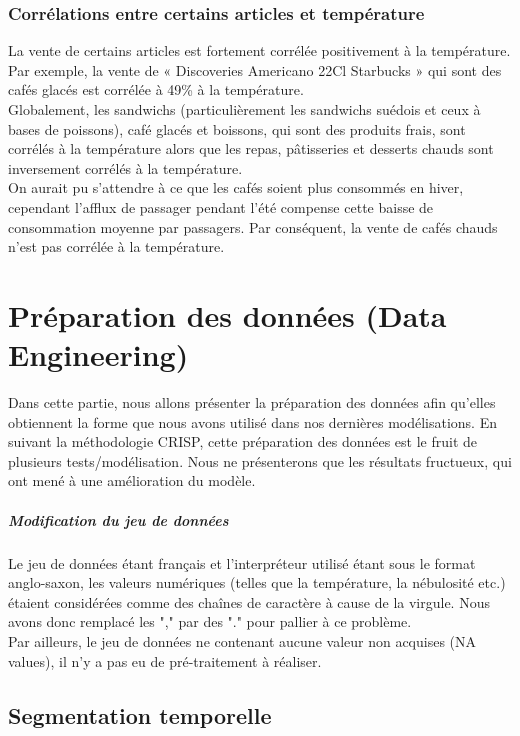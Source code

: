 \documentclass{article} %
\begin{document}
\subsubsection{Corrélations entre certains articles et température}
La vente de certains articles est fortement corrélée positivement à la température. Par exemple, la vente de « Discoveries Americano 22Cl Starbucks » qui sont des cafés glacés est corrélée à 49\% à la température. \\
Globalement, les sandwichs (particulièrement les sandwichs suédois et ceux à bases de poissons), café glacés et boissons, qui sont des produits frais, sont corrélés à la température alors que les repas, pâtisseries et desserts chauds sont inversement corrélés à la température.\\
On aurait pu s’attendre à ce que les cafés soient plus consommés en hiver, cependant l’afflux de passager pendant l’été compense cette baisse de consommation moyenne par passagers. Par conséquent, la vente de cafés chauds n’est pas corrélée à la température.



\newpage
\section{Préparation des données (Data Engineering)}
Dans cette partie, nous allons présenter la préparation des données afin qu'elles obtiennent la forme que nous avons utilisé dans nos dernières modélisations. En suivant la méthodologie CRISP, cette préparation des données est le fruit de plusieurs tests/modélisation. Nous ne présenterons que les résultats fructueux, qui ont mené à une amélioration du modèle.
\subparagraph{Modification du jeu de données}
Le jeu de données étant français et l'interpréteur utilisé étant sous le format anglo-saxon, les valeurs numériques (telles que la température, la nébulosité etc.) étaient considérées comme des chaînes de caractère à cause de la virgule. Nous avons donc remplacé les "," par des "." pour pallier à ce problème.\\
Par ailleurs, le jeu de données ne contenant aucune valeur non acquises (NA values), il n'y a pas eu de pré-traitement à réaliser.

\subsection{Segmentation temporelle}
\end{document}
